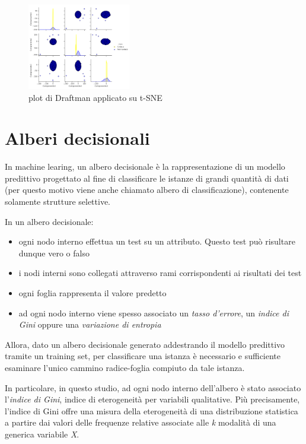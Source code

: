 \documentclass[11pt,a4paper,twocolumn]{article}
\begin{document}
	\begin{figure}[H]
		\centering
		\includegraphics[width=0.4\textwidth]{img/tSNE_SPLOM.png}
		\caption{plot di Draftman applicato su t-SNE}
	\end{figure}


\section{Alberi decisionali}
In machine learing, un albero decisionale è la rappresentazione di un modello predittivo progettato al fine di classificare le istanze di grandi quantità di dati (per questo motivo viene anche chiamato albero di classificazione), contenente solamente strutture selettive.\par
In un albero decisionale:
\begin{itemize}
	\item ogni nodo interno effettua un test su un attributo. Questo test può risultare dunque vero o falso
	\item i nodi interni sono collegati attraverso rami corrispondenti ai risultati dei test
	\item ogni foglia rappresenta il valore predetto
	\item ad ogni nodo interno viene spesso associato un \emph{tasso d'errore}, un \emph{indice di Gini} oppure una \emph{variazione di entropia}
\end{itemize}
Allora, dato un albero decisionale generato addestrando il modello predittivo tramite un training set, per classificare una istanza è necessario e sufficiente esaminare l'unico cammino radice-foglia compiuto da tale istanza.\par
In particolare, in questo studio, ad ogni nodo interno dell'albero è stato associato l'\emph{indice di Gini}, indice di eterogeneità per variabili qualitative. Più precisamente, l'indice di Gini offre una misura della eterogeneità di una distribuzione statistica a partire dai valori delle frequenze relative associate alle \emph{k} modalità di una generica variabile \emph{X}.
\end{document}
